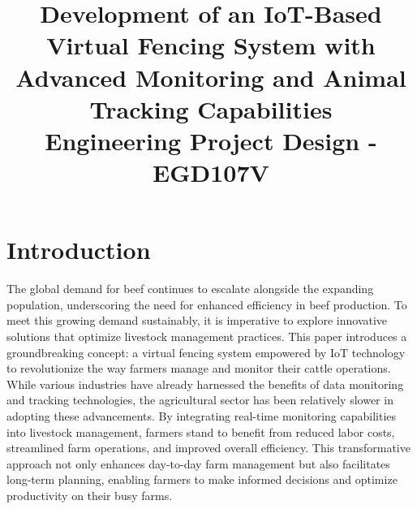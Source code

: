 \documentclass[conference]{main}
\begin{document}
\title{
    Development of an IoT-Based Virtual Fencing System with Advanced Monitoring and
    Animal Tracking Capabilities\\
{\footnotesize Engineering Project Design - EGD107V }
}

\author{
\and
{}
}

\maketitle



\section{Introduction}
The global demand for beef continues to escalate alongside the expanding
population, underscoring the need for enhanced efficiency in beef production. To
meet this growing demand sustainably\cite{b1}, it is imperative to explore innovative
solutions that optimize livestock management practices. This paper introduces a
groundbreaking concept: a virtual fencing system empowered by IoT technology to
revolutionize the way farmers manage and monitor their cattle operations. While
various industries have already harnessed the benefits of data monitoring and
tracking technologies, the agricultural sector has been relatively slower in
adopting these advancements. By integrating real-time monitoring capabilities
into livestock management, farmers stand to benefit from reduced labor costs,
streamlined farm operations, and improved overall efficiency. This
transformative approach not only enhances day-to-day farm management but also
facilitates long-term planning, enabling farmers to make informed decisions and
optimize productivity on their busy farms.
\end{document}
